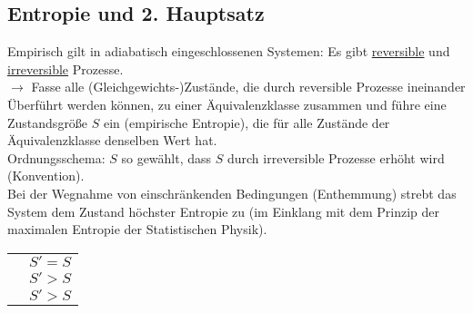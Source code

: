 \subsection{Entropie und 2. Hauptsatz}
Empirisch gilt in adiabatisch eingeschlossenen Systemen: Es gibt \uline{reversible} und \uline{irreversible} Prozesse.\\
$\rightarrow$ Fasse alle (Gleichgewichts-)Zustände, die durch reversible Prozesse ineinander Überführt werden können, zu einer Äquivalenzklasse zusammen und führe eine Zustandsgröße $S$ ein (empirische Entropie), die für alle Zustände der Äquivalenzklasse denselben Wert hat.\\
Ordnungsschema: $S$ so gewählt, dass $S$ durch irreversible Prozesse erhöht wird (Konvention).\\
Bei der Wegnahme von einschränkenden Bedingungen (\glqq Enthemmung\grqq) strebt das System dem Zustand höchster Entropie zu (im Einklang mit dem Prinzip der maximalen Entropie der Statistischen Physik).

\setlength{\tabcolsep}{0.5cm}
\renewcommand{\arraystretch}{3}
\begin{table}[H]
  \centering
  \begin{tabular}{c c}
    
    &
    $S' = S$\\
    
    &
    $S' > S$\\
    
    &
    $S' > S$
  \end{tabular}
\end{table}

